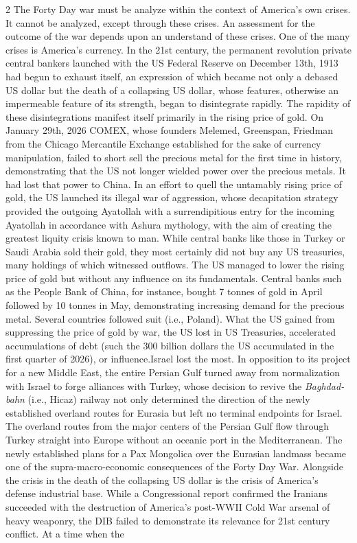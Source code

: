 \documentclass[10pt,a4paper,twoside]{article} %
\begin{document}
\begin{multicols}{2}
{\newline \indent The Forty Day war must be analyze within the context of America's own crises. It cannot be analyzed, except through these crises. An assessment for the outcome of the war depends upon an understand of these crises. One of the many crises is America's currency. In the 21st century, the permanent revolution private central bankers launched with the US Federal Reserve on December 13th, 1913 had begun to exhaust itself, an expression of which became not only a debased US dollar but the death of a collapsing US dollar, whose features, otherwise an impermeable feature of its strength, began to disintegrate rapidly. The rapidity of these disintegrations manifest itself primarily in the rising price of gold. On January 29th, 2026 COMEX, whose founders Melemed, Greenspan, Friedman from the Chicago Mercantile Exchange established for the sake of currency manipulation, failed to short sell the precious metal for the first time in history, demonstrating that the US not longer wielded power over the precious metals. It had lost that power to China. In an effort to quell the untamably rising price of gold, the US launched its illegal war of aggression, whose decapitation strategy provided the outgoing Ayatollah with a surrendipitious entry for the incoming Ayatollah in accordance with Ashura mythology, with the aim of creating the greatest liquity crisis known to man. While central banks like those in Turkey or Saudi Arabia sold their gold, they most certainly did not buy any US treasuries, many holdings of which witnessed outflows. The US managed to lower the rising price of gold but without any influence on its fundamentals. Central banks such as the People Bank of China, for instance, bought 7 tonnes of gold in April followed by 10 tonnes in May, demonstrating increasing demand for the precious metal. Several countries followed suit (i.e., Poland). What the US gained from suppressing the price of gold by war, the US lost in US Treasuries, accelerated accumulations of debt (such the 300 billion dollars the US accumulated in the first quarter of 2026), or influence.\newline \indent Israel lost the most. In opposition to its project for a new Middle East, the entire Persian Gulf turned away from normalization with Israel to forge alliances with Turkey, whose decision to revive the \textgerman{\emph{Baghdadbahn}} (i.e., Hicaz) railway not only determined the direction of the newly established overland routes for Eurasia but left no terminal endpoints for Israel. The overland routes from the major centers of the Persian Gulf flow through Turkey straight into Europe without an oceanic port in the Mediterranean. The newly established plans for a \textenglish{Pax Mongolica} over the Eurasian landmass became one of the supra-macro-economic consequences of the Forty Day War. \newline \indent Alongside the crisis in the death of the collapsing US dollar is the crisis of America's defense industrial base. While a Congressional report confirmed the Iranians succeeded with the destruction of America's post-WWII Cold War arsenal of heavy weaponry, the DIB failed to demonstrate its relevance for 21st century conflict. At a time when the }
\end{multicols}
\end{document}
